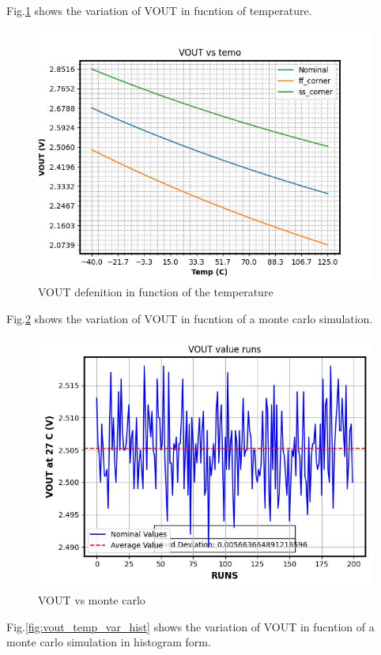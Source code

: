 \documentclass{article}
\begin{document}
Fig.\ref{fig:vout_temp_var}  shows the variation of VOUT in fucntion of temperature.

\begin{figure}[H] %
    \centering
    \includegraphics[width=.6\textwidth]{./only_PMOS_LOAD_VDC_NMOS.jpg} %
    \caption{VOUT defenition in function of the temperature}\label{fig:vout_temp_var}
\end{figure}




Fig.\ref{fig:vout_temp_var_monte}  shows the variation of VOUT in fucntion of a monte carlo simulation.

\begin{figure}[H] %
    \centering
    \includegraphics[width=.6\textwidth]{./VOUT_value_runs.jpg} %
    \caption{VOUT vs monte carlo}\label{fig:vout_temp_var_monte}
\end{figure}




Fig.\ref{fig:vout_temp_var_hist}  shows the variation of VOUT in fucntion of a monte carlo simulation in histogram form.
\end{document}
